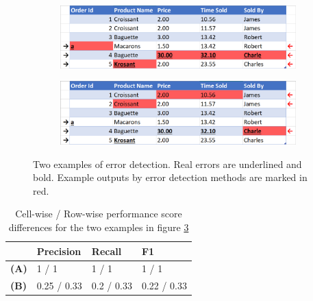 \begin{figure}
\centering
    \begin{subfigure}{0.9\textwidth}
        \includegraphics[width=\linewidth]{thesis/Figures/Method/Errors_dataset_F1_row.png}
        \caption{}
        \label{subfig:errors_row}
    \end{subfigure}
    \begin{subfigure}{0.9\textwidth}
        \includegraphics[width=\linewidth]{thesis/Figures/Method/Errors_dataset_Worse_F1_row.png}
        \caption{}
        \label{subfig:errors_row_worse}
    \end{subfigure}
    \caption{Two examples of error detection. Real errors are underlined and bold. Example outputs by error detection methods are marked in red.}
    \label{fig:error_row_wise}
\end{figure}

\begin{table}[]
\centering
\begin{tabular}{l|lll}
\textbf{}    & \textbf{Precision} & \textbf{Recall} & \textbf{F1} \\ \hline
\textbf{(A)} & 1 / 1              & 1 / 1           & 1 / 1       \\
\textbf{(B)} & 0.25 / 0.33        & 0.2 / 0.33      & 0.22 / 0.33
\end{tabular}
\caption{Cell-wise / Row-wise performance score differences for the two examples in figure \ref{fig:error_row_wise}}
\label{tab:cell_vs_row_scores}
\end{table}

